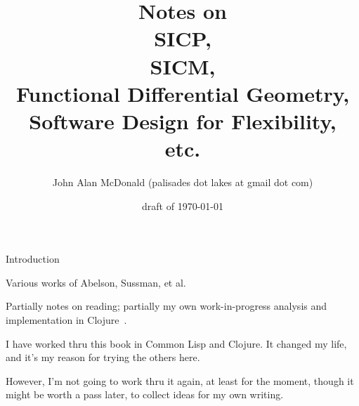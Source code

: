 \documentclass[11pt]{PalisadesLakesBook}
\title{Notes on\\
 SICP,\\
  SICM,\\
   Functional Differential Geometry,\\ 
 Software Design for Flexibility, \\
 etc.}
\author{John Alan McDonald 
(palisades dot lakes at gmail dot com)}
\date{draft of \today}
\begin{document}
\maketitle
{}
\def\sharedFolder{../../shared/}
\begin{plSection}{Introduction}

Various works of Abelson, Sussman, et al.
 
Partially notes on reading; 
partially my own work-in-progress analysis 
and implementation in 
Clojure~\cite{
EmerickCarperGrand:2012:ClojureProgramming,
FogusHouser:2011:JoyOfClojure,
Halloway:2009:Clojure,
Hickey:2012:Clojure,
Rathore:2011:Clojure,
VanderhartSierra:2009:Clojure,}.






\end{plSection}%
\begin{plSection}{}

I have worked thru this book in Common Lisp and Clojure.
It changed my life, and it's my reason for trying the others here.

However, I'm not going to work thru it again, 
at least for the moment,
though it might be worth a pass later, to collect ideas 
for my own writing.

\end{plSection}%
\begin{plSection}{}
\end{plSection}%
\begin{plSection}{}
\end{plSection}%
\end{document}
